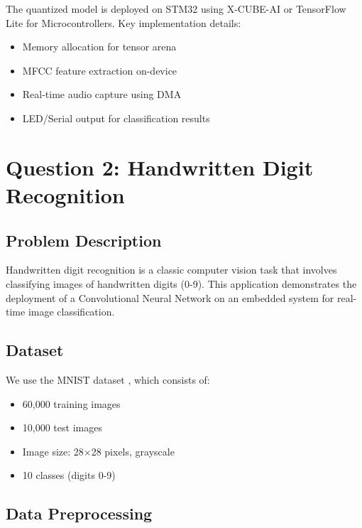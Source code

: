 \documentclass[12pt,a4paper]{article}
\begin{document}
The quantized model is deployed on STM32 using X-CUBE-AI or TensorFlow Lite for Microcontrollers. Key implementation details:

\begin{itemize}
    \item Memory allocation for tensor arena
    \item MFCC feature extraction on-device
    \item Real-time audio capture using DMA
    \item LED/Serial output for classification results
\end{itemize}

\section{Question 2: Handwritten Digit Recognition}

\subsection{Problem Description}

Handwritten digit recognition is a classic computer vision task that involves classifying images of handwritten digits (0-9). This application demonstrates the deployment of a Convolutional Neural Network on an embedded system for real-time image classification.

\subsection{Dataset}

We use the MNIST dataset \cite{mnist}, which consists of:

\begin{itemize}
    \item 60,000 training images
    \item 10,000 test images
    \item Image size: 28×28 pixels, grayscale
    \item 10 classes (digits 0-9)
\end{itemize}

\subsection{Data Preprocessing}
\end{document}
